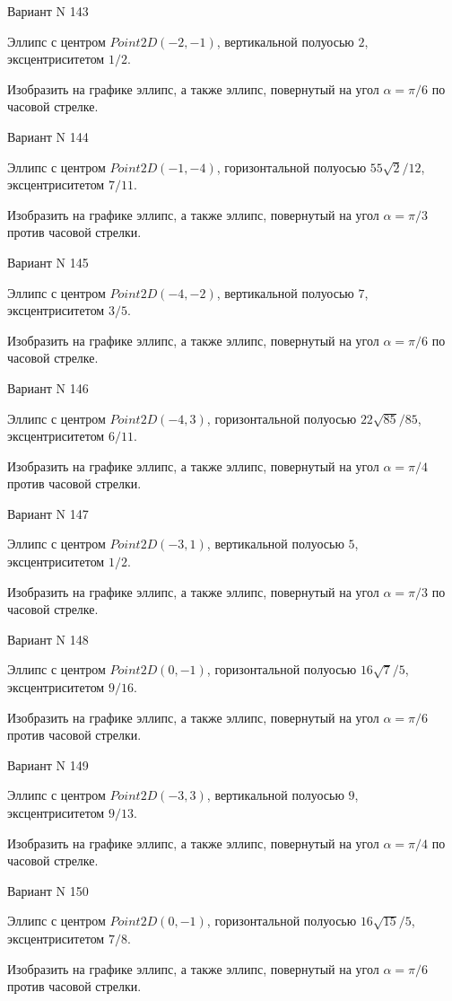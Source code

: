 \documentclass[11pt]{report}
\begin{document}
Вариант N 143

Эллипс с центром $Point2D\left(-2, -1\right)$, вертикальной полуосью $2$, эксцентриситетом $1 / 2$.

    Изобразить на графике эллипс, а также эллипс, повернутый на угол $\alpha = $$\pi / 6$ по часовой стрелке.

Вариант N 144

Эллипс с центром $Point2D\left(-1, -4\right)$, горизонтальной полуосью $55 \sqrt{2} / 12$, эксцентриситетом $7 / 11$.

    Изобразить на графике эллипс, а также эллипс, повернутый на угол $\alpha = $$\pi / 3$ против часовой стрелки.

Вариант N 145

Эллипс с центром $Point2D\left(-4, -2\right)$, вертикальной полуосью $7$, эксцентриситетом $3 / 5$.

    Изобразить на графике эллипс, а также эллипс, повернутый на угол $\alpha = $$\pi / 6$ по часовой стрелке.

Вариант N 146

Эллипс с центром $Point2D\left(-4, 3\right)$, горизонтальной полуосью $22 \sqrt{85} / 85$, эксцентриситетом $6 / 11$.

    Изобразить на графике эллипс, а также эллипс, повернутый на угол $\alpha = $$\pi / 4$ против часовой стрелки.

Вариант N 147

Эллипс с центром $Point2D\left(-3, 1\right)$, вертикальной полуосью $5$, эксцентриситетом $1 / 2$.

    Изобразить на графике эллипс, а также эллипс, повернутый на угол $\alpha = $$\pi / 3$ по часовой стрелке.

Вариант N 148

Эллипс с центром $Point2D\left(0, -1\right)$, горизонтальной полуосью $16 \sqrt{7} / 5$, эксцентриситетом $9 / 16$.

    Изобразить на графике эллипс, а также эллипс, повернутый на угол $\alpha = $$\pi / 6$ против часовой стрелки.

Вариант N 149

Эллипс с центром $Point2D\left(-3, 3\right)$, вертикальной полуосью $9$, эксцентриситетом $9 / 13$.

    Изобразить на графике эллипс, а также эллипс, повернутый на угол $\alpha = $$\pi / 4$ по часовой стрелке.

Вариант N 150

Эллипс с центром $Point2D\left(0, -1\right)$, горизонтальной полуосью $16 \sqrt{15} / 5$, эксцентриситетом $7 / 8$.

    Изобразить на графике эллипс, а также эллипс, повернутый на угол $\alpha = $$\pi / 6$ против часовой стрелки.
\end{document}
